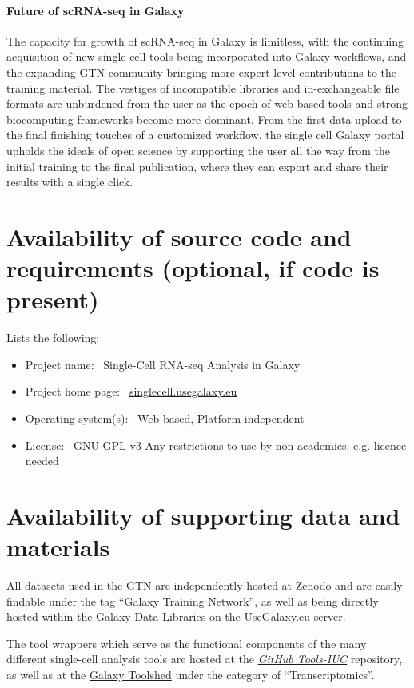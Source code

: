 \documentclass[a4paper,num-refs]{oup-contemporary}
\begin{document}
\paragraph{Future of scRNA-seq in Galaxy}
The capacity for growth of scRNA-seq in Galaxy is limitless, with the continuing acquisition of new single-cell tools being incorporated into Galaxy workflows, and the expanding GTN community bringing more expert-level contributions to the training material. The vestiges of incompatible libraries and in-exchangeable file formats are unburdened from the user as the epoch of web-based tools and strong biocomputing frameworks become more dominant. From the first data upload to the final finishing touches of a customized workflow, the single cell Galaxy portal upholds the ideals of open science by supporting the user all the way from the initial training to the final publication, where they can export and share their results with a single click. 

\section{Availability of source code and requirements (optional, if code is present)}

Lists the following:
\begin{itemize}
\item Project name: ~Single-Cell RNA-seq Analysis in Galaxy
\item Project home page: ~\url{singlecell.usegalaxy.eu}
\item Operating system(s): ~Web-based, Platform independent
\item License: ~GNU GPL v3 %
Any restrictions to use by non-academics: e.g. licence needed
\end{itemize}

\section{Availability of supporting data and materials}

All datasets used in the GTN are independently hosted at \href{https://zenodo.org/}{Zenodo} and are easily findable under the tag ``Galaxy Training Network'', as well as being directly hosted within the Galaxy Data Libraries on the \href{https://singlecell.usegalaxy.eu}{UseGalaxy.eu} server.

The tool wrappers which serve as the functional components of the many different single-cell analysis tools are hosted at the \href{https://github.com/galaxyproject/tools-iuc/}{\textit{GitHub Tools-IUC}} repository, as well as at the \href{https://toolshed.g2.bx.psu.edu/}{Galaxy Toolshed} under the category of ``Transcriptomics''.
\end{document}
